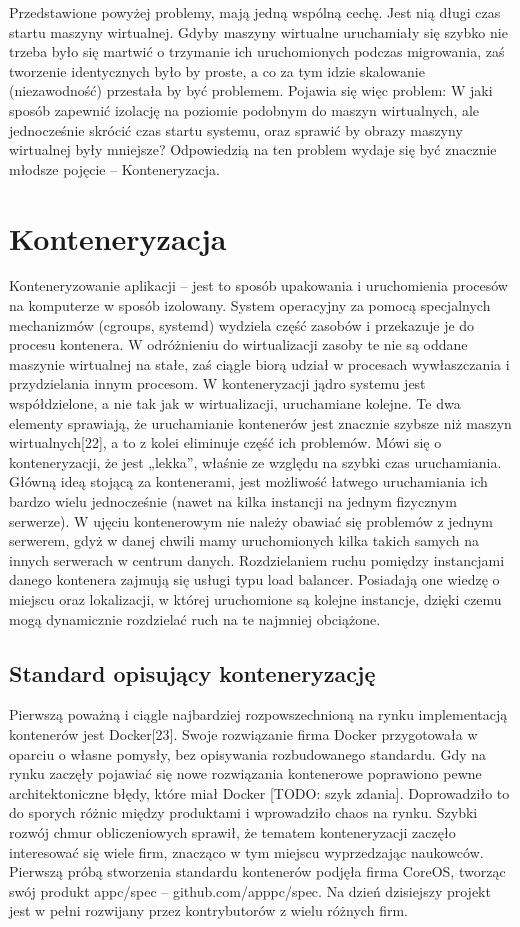 \documentclass[10pt,a4paper,titlepage,twoside]{report}
\begin{document}
\indent \indent Przedstawione powyżej problemy, mają jedną wspólną cechę. Jest nią długi czas startu maszyny wirtualnej. Gdyby maszyny wirtualne uruchamiały się szybko nie trzeba było się martwić o trzymanie ich uruchomionych podczas migrowania, zaś tworzenie identycznych było by proste, a co za tym idzie skalowanie (niezawodność) przestała by być problemem. Pojawia się więc problem: W jaki sposób zapewnić izolację na poziomie podobnym do maszyn wirtualnych, ale jednocześnie skrócić czas startu systemu, oraz sprawić by obrazy maszyny wirtualnej były mniejsze? Odpowiedzią na ten problem wydaje się być znacznie młodsze pojęcie – Konteneryzacja.

\section{Konteneryzacja}
\indent \indent Konteneryzowanie aplikacji – jest to sposób upakowania i uruchomienia procesów na komputerze w sposób izolowany. System operacyjny za pomocą specjalnych mechanizmów (cgroups, systemd) wydziela część zasobów i przekazuje je do procesu kontenera. W odróżnieniu do wirtualizacji zasoby te nie są oddane maszynie wirtualnej na stałe, zaś ciągle biorą udział w procesach wywłaszczania i przydzielania innym procesom. W konteneryzacji jądro systemu jest współdzielone, a nie tak jak w wirtualizacji, uruchamiane kolejne. Te dwa elementy sprawiają, że uruchamianie kontenerów jest znacznie szybsze niż maszyn wirtualnych[22], a to z kolei eliminuje część ich problemów. Mówi się o konteneryzacji, że jest „lekka”, właśnie ze względu na szybki czas uruchamiania. Główną ideą stojącą za kontenerami, jest możliwość łatwego uruchamiania ich bardzo wielu jednocześnie (nawet na kilka instancji na jednym fizycznym serwerze). W ujęciu kontenerowym nie należy obawiać się problemów z jednym serwerem, gdyż w danej chwili mamy uruchomionych kilka takich samych na innych serwerach w centrum danych. Rozdzielaniem ruchu pomiędzy instancjami danego kontenera zajmują się usługi typu load balancer. Posiadają one wiedzę o miejscu oraz lokalizacji, w której uruchomione są kolejne instancje, dzięki czemu mogą dynamicznie rozdzielać ruch na te najmniej obciążone.

\subsection{Standard opisujący konteneryzację}\indent \indent
Pierwszą poważną i ciągle najbardziej rozpowszechnioną na rynku implementacją kontenerów jest Docker[23]. Swoje rozwiązanie firma Docker przygotowała w oparciu o własne pomysły, bez opisywania rozbudowanego standardu. Gdy na rynku zaczęły pojawiać się nowe rozwiązania kontenerowe poprawiono pewne architektoniczne błędy, które miał Docker [TODO: szyk zdania]. Doprowadziło to do sporych różnic między produktami i wprowadziło chaos na rynku. Szybki rozwój chmur obliczeniowych sprawił, że tematem konteneryzacji zaczęło interesować się wiele firm, znacząco w tym miejscu wyprzedzając naukowców. Pierwszą próbą stworzenia standardu kontenerów podjęła firma CoreOS, tworząc swój produkt appc/spec – github.com/apppc/spec. Na dzień dzisiejszy projekt jest w pełni rozwijany przez kontrybutorów z wielu różnych firm. 
\end{document}

